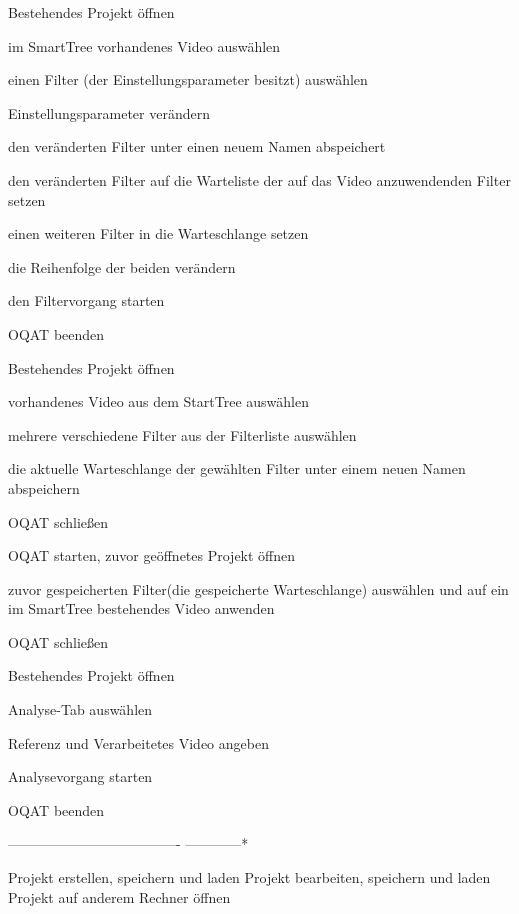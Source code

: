 \begin{compactitem}
\item Bestehendes Projekt öffnen
\item im SmartTree vorhandenes Video auswählen
\item einen Filter (der Einstellungsparameter besitzt) auswählen
\item Einstellungsparameter verändern
\item den veränderten Filter unter einen neuem Namen abspeichert
\item den veränderten Filter auf die Warteliste der auf das Video anzuwendenden Filter setzen
\item einen weiteren Filter in die Warteschlange setzen
\item die Reihenfolge der beiden verändern
\item den Filtervorgang starten
\item OQAT beenden
\end{compactitem}

\begin{compactitem}
\item Bestehendes Projekt öffnen
\item vorhandenes Video aus dem StartTree auswählen
\item mehrere verschiedene Filter aus der Filterliste auswählen
\item die aktuelle Warteschlange der gewählten Filter unter einem neuen Namen abspeichern
\item OQAT schließen
\item OQAT starten, zuvor geöffnetes Projekt öffnen
\item zuvor gespeicherten Filter(die gespeicherte Warteschlange) auswählen und auf ein im SmartTree bestehendes Video anwenden
\item OQAT schließen
\end{compactitem}
\begin{compactitem}
\item Bestehendes Projekt öffnen
\item Analyse-Tab auswählen
\item Referenz und Verarbeitetes Video angeben
\item Analysevorgang starten 
\item OQAT beenden
\end{compactitem}
-------------------------------------
------------*

 Projekt erstellen, speichern und laden
 Projekt bearbeiten, speichern und laden
 Projekt auf anderem Rechner öffnen

